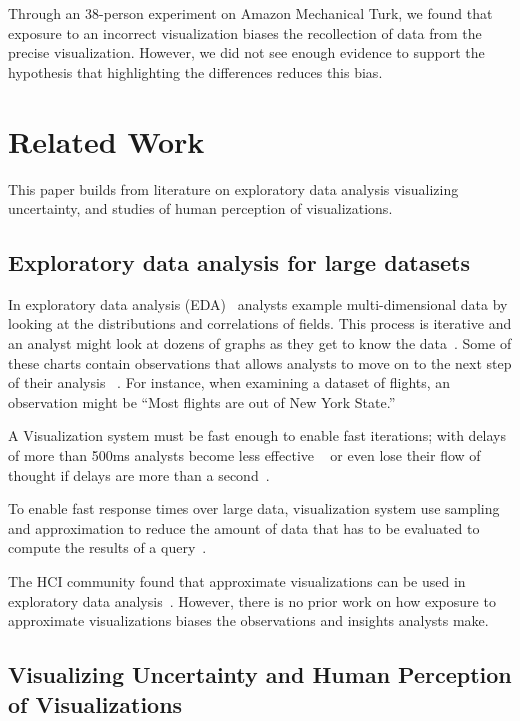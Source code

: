 \documentclass[10pt,journal,compsoc]{IEEEtran}
\begin{document}
Through an 38-person experiment on Amazon Mechanical Turk, we found that exposure to an incorrect visualization biases the recollection of data from the precise visualization.
However, we did not see enough evidence to support the hypothesis that highlighting the differences reduces this bias.

\section{Related Work}\label{sec:related_work}

This paper builds from literature on exploratory data analysis visualizing uncertainty, and studies of human perception of visualizations.

\subsection{Exploratory data analysis for large datasets}

In exploratory data analysis (EDA)~\cite{tukey1977exploratory} analysts example multi-dimensional data by looking at the distributions and correlations of fields.
This process is iterative and an analyst might look at dozens of graphs as they get to know the data~\cite{card1991information}. Some of these charts contain observations that allows analysts to move on to the next step of their analysis ~\cite{yi2008understanding}.
For instance, when examining a dataset of flights, an observation might be ``Most flights are out of New York State.''

A Visualization system must be fast enough to enable fast iterations; with delays of more than 500ms analysts become less effective ~\cite{liu2014effects} or even lose their flow of thought if delays are more than a second~\cite{nielsen1993response}.

To enable fast response times over large data, visualization system use sampling and approximation to reduce the amount of data that has to be evaluated to compute the results of a query~\cite{agarwal2013blinkdb,ding2016sample+,kamat2014distributed}.

The HCI community found that approximate visualizations can be used in exploratory data analysis~\cite{fisher2012trust, moritz2017pangloss}.
However, there is no prior work on how exposure to approximate visualizations biases the observations and insights analysts make.

\subsection{Visualizing Uncertainty and Human Perception of Visualizations}
\end{document}
